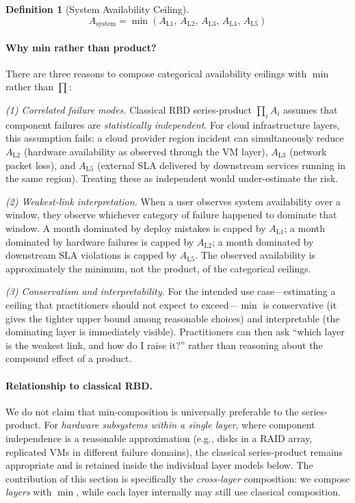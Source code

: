 \documentclass[10pt,twocolumn]{article}
\newtheorem{definition}{Definition}
\begin{document}
\begin{definition}[System Availability Ceiling]
\begin{equation}
  A_{\text{system}} = \min(A_{\text{L1}},\, A_{\text{L2}},\, A_{\text{L3}},\, A_{\text{L4}},\, A_{\text{L5}})
\end{equation}
\end{definition}

\paragraph{Why min rather than product?}
There are three reasons to compose categorical availability ceilings
with $\min$ rather than $\prod$:

\emph{(1) Correlated failure modes.}
Classical RBD series-product
$\prod_i A_i$ assumes that component failures are
\emph{statistically independent}. For cloud infrastructure layers,
this assumption fails: a cloud provider region incident can
simultaneously reduce $A_{\text{L2}}$ (hardware availability as
observed through the VM layer), $A_{\text{L3}}$ (network packet
loss), and $A_{\text{L5}}$ (external SLA delivered by downstream
services running in the same region). Treating these as
independent would under-estimate the risk.

\emph{(2) Weakest-link interpretation.}
When a user observes system availability over a window, they
observe whichever category of failure happened to dominate that
window. A month dominated by deploy mistakes is capped by
$A_{\text{L1}}$; a month dominated by hardware failures is capped
by $A_{\text{L2}}$; a month dominated by downstream SLA violations
is capped by $A_{\text{L5}}$. The observed availability is
approximately the minimum, not the product, of the categorical
ceilings.

\emph{(3) Conservatism and interpretability.}
For the intended use case---estimating a ceiling that practitioners
should not expect to exceed---$\min$ is conservative (it gives the
tighter upper bound among reasonable choices) and interpretable
(the dominating layer is immediately visible). Practitioners can
then ask ``which layer is the weakest link, and how do I raise it?''
rather than reasoning about the compound effect of a product.

\paragraph{Relationship to classical RBD.}
We do not claim that min-composition is universally preferable to
the series-product. For \emph{hardware subsystems within a single
layer}, where component independence is a reasonable approximation
(e.g., disks in a RAID array, replicated VMs in different failure
domains), the classical series-product remains appropriate and is
retained inside the individual layer models below. The contribution
of this section is specifically the \emph{cross-layer} composition:
we compose \emph{layers} with $\min$, while each layer internally
may still use classical composition.
\end{document}

